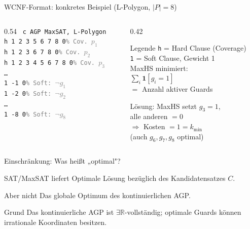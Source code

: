 \documentclass[11pt,aspectratio=169]{beamer}
\newcommand{\guard}[1]{g_{#1}}
\begin{document}
\begin{frame}{WCNF-Format: konkretes Beispiel (L-Polygon, $|P|=8$)}
  \begin{columns}[T]
    \begin{column}{0.54\textwidth}
      \texttt{\small
        c AGP MaxSAT, L-Polygon \\[0.2em]
        \textcolor{mygreen}{h} 1 2 3 5 6 7 8 0\quad\textcolor{gray}{\% Cov.\ $p_1$}\\
        \textcolor{mygreen}{h} 1 2 3 6 7 8 0\quad\textcolor{gray}{\% Cov.\ $p_2$}\\
        \textcolor{mygreen}{h} 1 2 3 4 5 6 7 8 0\quad\textcolor{gray}{\% Cov.\ $p_3$}\\
        \quad\ldots\\[0.3em]
        \textcolor{amber}{1} {-1} 0\quad\textcolor{gray}{\% Soft: $\neg\guard{1}$}\\
        \textcolor{amber}{1} {-2} 0\quad\textcolor{gray}{\% Soft: $\neg\guard{2}$}\\
        \quad\ldots\\
        \textcolor{amber}{1} {-8} 0\quad\textcolor{gray}{\% Soft: $\neg\guard{8}$}\\
      }
    \end{column}
    \begin{column}{0.42\textwidth}
      \begin{block}{Legende}
        \textcolor{mygreen}{\texttt{h}} = Hard Clause (Coverage)\\
        \textcolor{amber}{\texttt{1}} = Soft Clause, Gewicht 1\\[0.5em]
        MaxHS minimiert:\\
        $\sum_i \mathbf{1}[\guard{i}=1]$\\
        $=$ Anzahl aktiver Guards
      \end{block}
      \vspace{0.4em}
      \small
      Lösung: MaxHS setzt $\guard{3}=1$,\\
      alle anderen $=0$\\
      $\Rightarrow$ Kosten $= 1 = k_{\min}$\\
      (auch $\guard{6},\guard{7},\guard{8}$ optimal)
    \end{column}
  \end{columns}
\end{frame}

\begin{frame}{Einschränkung: Was heißt „optimal"?}
\begin{block}{SAT/MaxSAT liefert}
  Optimale Lösung bezüglich des Kandidatensatzes $C$.
\end{block}
\begin{alertblock}{Aber nicht}
  Das globale Optimum des kontinuierlichen AGP.
\end{alertblock}
\begin{block}{Grund}
  Das kontinuierliche AGP ist $\exists\mathbb{R}$-vollständig;
  optimale Guards können irrationale Koordinaten besitzen.
\end{block}
\end{frame}
\end{document}
